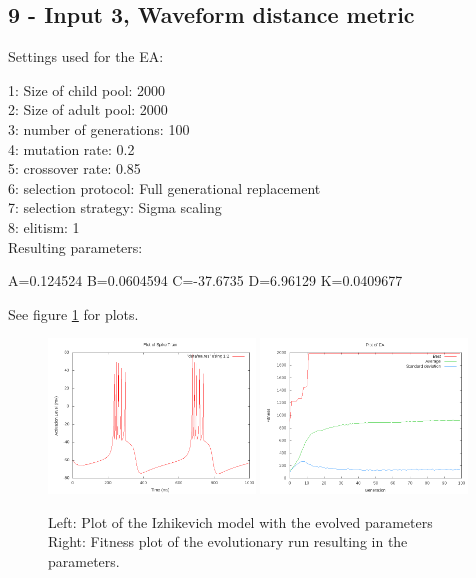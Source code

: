 \documentclass[11pt]{article}
\begin{document}
\subsection*{9 - Input 3, Waveform distance metric}

Settings used for the EA:

1: Size of child pool: 2000\\
2: Size of adult pool: 2000\\
3: number of generations: 100\\
4: mutation rate: 0.2\\
5: crossover rate: 0.85\\
6: selection protocol: Full generational replacement\\
7: selection strategy: Sigma scaling\\
8: elitism: 1\\

Resulting parameters:

A=0.124524 B=0.0604594 C=-37.6735 D=6.96129 K=0.0409677

See figure \ref{fig:9} for plots.

\begin{figure}
\begin{center}
\mbox{\includegraphics[width=0.49\textwidth]{images/9-res.png}}
\mbox{\includegraphics[width=0.49\textwidth]{images/9-fit.png}}
\end{center}
\caption{Left: Plot of the Izhikevich model with the evolved parameters\\
Right: Fitness plot of the evolutionary run resulting in the parameters.}
\label{fig:9}
\end{figure}
\end{document}
